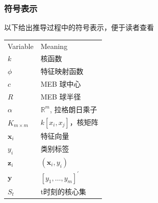 \documentclass[UTF8, fleqn,10pt]{SelfArx} %
\begin{document}
			\subsubsection{符号表示}
			以下给出推导过程中的符号表示，便于读者查看
			\begin{table}[H]
				\centering
				\begin{tabular}{ll}
					\hline
					Variable & Meaning \\
					$k$ & 核函数\\
					$\phi$ & 特征映射函数\\
					$c$ & MEB 球中心\\
					$R$ & MEB 球半径\\
					$\alpha$ & $\mathbb{R}^m$, 拉格朗日乘子\\
					$K_{m \times m}$ & $k[x_i, x_j]$，核矩阵\\
					$\mathbf{x}_{i}$ & 特征向量\\
					$y_i$ & 类别标签\\
					$\mathbf{z}_{i}$ &$\left(\mathbf{x}_{i}, y_{i}\right)$\\
					$\mathbf{y}$&$\left[y_{1}, \ldots, y_{m}\right]^{\prime}$\\
					$S_t$ & t时刻的核心集\\
					\hline
				\end{tabular}
			\end{table}
\end{document}
